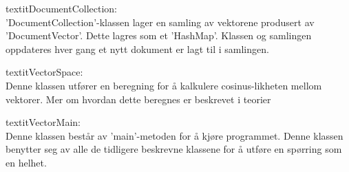 \begin{description}
\begin{description}
\item{textit{DocumentCollection: }}\\
'DocumentCollection'-klassen lager en samling av vektorene produsert av 'DocumentVector'. Dette lagres som et 'HashMap'. Klassen og samlingen oppdateres hver gang et nytt dokument er lagt til i samlingen. 
\item{textit{VectorSpace: }}\\
Denne klassen utfører en beregning for å kalkulere cosinus-likheten mellom vektorer. Mer om hvordan dette beregnes er beskrevet i teorier %
\item{textit{VectorMain: }}\\
Denne klassen består av 'main'-metoden for å kjøre programmet. Denne klassen benytter seg av alle de tidligere beskrevne klassene for å utføre en spørring som en helhet.
\end{description}
\end{description}